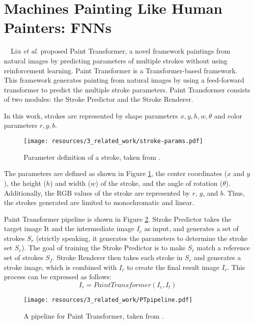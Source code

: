 \section{Machines Painting Like Human Painters: FNNs}
　Liu \textit{et al}. \cite{liu2021paint} proposed Paint Transformer, a novel 
framework paintings from natural images by predicting parameters of multiple 
strokes without using reinforcement learning. 
Paint Transformer is a Transformer-based framework. This framework generates 
painting from natural images by using a feed-forward transformer to predict 
the multiple stroke parameters. 
Paint Transformer consists of two modules: the Stroke Predictor and the Stroke Renderer.  

In this work, strokes are represented by shape parameters ${x, y, h, w, \theta}$ 
and color parameters ${r, g, b}$.
\begin{figure}[h]
    \centering
    \texttt{[image: resources/3\_related\_work/stroke-params.pdf]}
    \caption{
        Parameter definition of a stroke,
        taken from \cite{liu2021paint}.
    }
    \label{strokeparams}
\end{figure}
\newline
The parameters are defined as shown in Figure \ref{strokeparams}, the center 
coordinates ($x$ and $y$), the height ($h$) and width ($w$) of the stroke, 
and the angle of rotation ($\theta$). Additionally, the RGB values of the 
stroke are represented by $r$, $g$, and $b$. Thus, the strokes generated are 
limited to monochromatic and linear.

Paint Transformer pipeline is shown in Figure \ref{PTpipeline}.
Stroke Predictor takes the target image It and the intermediate 
image $I_c$ as input, and generates a set of strokes $S_r$
(strictly speaking, it generates the parameters to determine the stroke set $S_r$).
The goal of training the Stroke Predictor is to make $S_r$ match a reference set
of strokes $S_f$. 
Stroke Renderer then takes each stroke in $S_r$ and generates a stroke image, 
which is combined with $I_c$ to create the final result image $I_r$.
This process can be expressed as follows:
\begin{equation}
    \label{painttransformer}
    I_r = PaintTransformer(I_c, I_t)
\end{equation}
\vspace{5mm}
\begin{figure}[t]
    \centering
    \texttt{[image: resources/3\_related\_work/PTpipeline.pdf]}
    \caption{
        A pipeline for Paint Transformer,
        taken from \cite{liu2021paint}.
    }
    \label{PTpipeline}
\end{figure}

